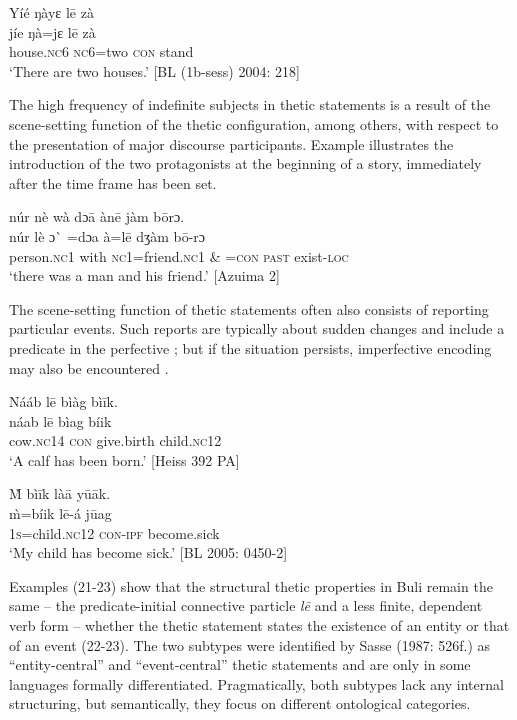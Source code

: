 \documentclass[output=paper]{langsci/langscibook}
\begin{document}
\ea
\glll \textup{}  Yíé    ŋàyɛ    l\={e}  zà\\
  \textup{  jíe    ŋà=jɛ    l\={e}  zà} \\
       house.\textsc{nc}6  \textsc{nc}6=two  \textsc{con}  stand\\
\glt ‘There are two houses.’ [BL (1b-sess) 2004: 218]
\z

The high frequency of indefinite subjects in thetic statements is a result of the scene-setting function of the thetic configuration, among others, with respect to the presentation of major discourse participants. Example  illustrates the introduction of the two protagonists at the beginning of a story, immediately after the time frame has been set. 

\ea
\glll \textup{}  núr    nè  wà   dɔ\={a}    àn\={e}    jàm  b\={o}rɔ.\\
  \textup{  núr    lè } ɔ\`{} \textup{=dɔa      à=l\={e}    dʒàm  b\={o}-rɔ}\\
       person.\textsc{nc}1  with  \textsc{nc}1=friend.\textsc{nc}1  \& =\textsc{con}  \textsc{past}  exist-\textsc{loc}\\
\glt ‘there was a man and his friend.’ [Azuima 2]
\z

The scene-setting function of thetic statements often also consists of reporting particular events. Such reports are typically about sudden changes and include a predicate in the perfective ; but if the situation persists, imperfective encoding may also be encountered .

\ea
\glll \textup{}  Nááb    l\={e}  bìàg    bì\={i}k.\\
  \textup{  náab    l\={e}  bìag    bíik}\\
       cow.\textsc{nc}14  \textsc{con}   give.birth  child.\textsc{nc}12\\
\glt ‘A calf has been born.’ [Heiss 392 PA]
\z

\ea
\glll \textup{}  \`{M}  bì\={i}k      là\={a}    y\={u}\={a}k.\\
  \textup{  \`{m}=bíik      l\={e}-á    j\={u}ag}\\
       1\textsc{s}=child.\textsc{nc}12    \textsc{con}-\textsc{ipf}  become.sick\\
\glt ‘My child has become sick.’ [BL  2005: 0450-2]
\z

Examples (21-23) show that the structural thetic properties in Buli remain the same – the predicate-initial connective particle \textit{l\={e}} and a less finite, dependent verb form – whether the thetic statement states the existence of an entity  or that of an event (22-23). The two subtypes were identified by Sasse (1987: 526f.) as “entity-central” and “event-central” thetic statements and are only in some languages formally differentiated. Pragmatically, both subtypes lack any internal structuring, but semantically, they focus on different ontological categories.
\end{document}
